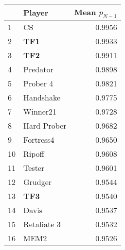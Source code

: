 \begin{tabular}{llr}
\toprule
{} &       Player &  Mean $p_{N-1}$ \\
\midrule
1  &           CS &          0.9956 \\
2  &          \textbf{TF1} &          0.9933 \\
3  &          \textbf{TF2} &          0.9911 \\
4  &     Predator &          0.9898 \\
5  &     Prober 4 &          0.9821 \\
6  &    Handshake &          0.9775 \\
7  &     Winner21 &          0.9728 \\
8  &  Hard Prober &          0.9682 \\
9  &    Fortress4 &          0.9650 \\
10 &       Ripoff &          0.9608 \\
11 &       Tester &          0.9601 \\
12 &      Grudger &          0.9544 \\
13 &          \textbf{TF3} &          0.9540 \\
14 &        Davis &          0.9537 \\
15 &  Retaliate 3 &          0.9532 \\
16 &         MEM2 &          0.9526 \\
\bottomrule
\end{tabular}
